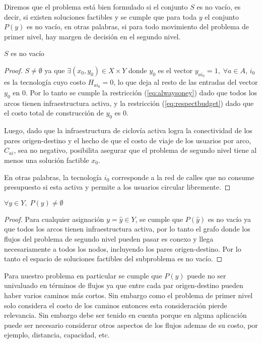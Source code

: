 Diremos que el problema está bien formulado si el conjunto $S$ es no vacío, es decir, si existen soluciones factibles y se cumple que para toda $y$ el conjunto $P(y)$ es no vacío, en otras palabras, si para todo movimiento del problema de primer nivel, hay margen de decisión en el segundo nivel.

\begin{lemma}$S$ es no vacío
\end{lemma}

\begin{proof}
$S \neq \emptyset$ ya que $\exists (x_0, y_0) \in X \times Y$ donde $y_0$ es el vector $y_{ai_0} = 1,\;\forall a \in A$, $i_0$ es la tecnología cuyo costo $H_{ai_0} = 0$, lo que deja al resto de las entradas del vector $y_0$ en $0$. Por lo tanto se cumple la restricción (\ref{eq:alwaysoney}) dado que todos los arcos tienen infraestructura activa, y la restricción (\ref{eq:respectbudget}) dado que el costo total de construcción de $y_0$ es $0$.

Luego, dado que la infraestructura de ciclovía activa logra la conectividad de los pares origen-destino y el hecho de que el costo de viaje de los usuarios por arco, $C_{ai}$, sea no negativo, posibilita asegurar que el problema de segundo nivel tiene al menos una solución factible $x_0$.

En otras palabras, la tecnología $i_0$ corresponde a la red de calles que no consume presupuesto si esta activa y permite a los usuarios circular libremente.

\end{proof}

\begin{lemma}$\forall y \in Y,\; P(y) \neq \emptyset$
\end{lemma}

\begin{proof}
Para cualquier asignación $y = \hat{y} \in Y$, se cumple que $P(\hat{y})$ es no vacío ya que todos los arcos tienen infraestructura activa, por lo tanto el grafo donde los flujos del problema de segundo nivel pueden pasar es conexo y llega necesariamente a todos los nodos, incluyendo los pares origen-destino. Por lo tanto el espacio de soluciones factibles del subproblema es no vacío. 
\end{proof}

Para nuestro problema en particular se cumple que $P(y)$ puede no ser univaluado en términos de flujos ya que entre cada par origen-destino pueden haber varios caminos más cortos. Sin embargo como el problema de primer nivel solo considera el costo de los caminos entonces esta consideración pierde relevancia. Sin embargo debe ser tenido en cuenta porque en alguna aplicación puede ser necesario considerar otros aspectos de los flujos ademas de su costo, por ejemplo, distancia, capacidad, etc.

